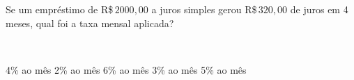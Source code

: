 \parbox{\linewidth}{

Se um empréstimo de R\$\,$2000{,}00$ a juros simples gerou R\$\,$320{,}00$ de juros em 4 meses, qual foi a taxa mensal aplicada?}
\vspace{2mm}
\\\parbox{\linewidth}{

4\% ao mês
2\% ao mês
6\% ao mês
3\% ao mês
5\% ao mês

}

